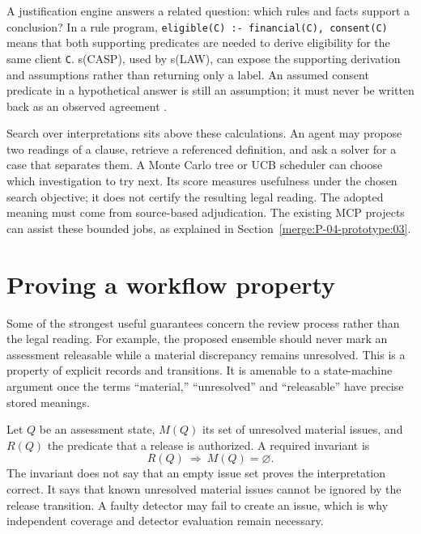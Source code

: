 \documentclass[12pt,a4paper,oneside,openany]{book}
\begin{document}
A justification engine answers a related question: which rules and facts support
a conclusion? In a rule program, \texttt{eligible(C) :- financial(C), consent(C)}
means that both supporting predicates are needed to derive eligibility for the
same client \texttt{C}. s(CASP), used by s(LAW), can expose the supporting
derivation and assumptions rather than returning only a label. An assumed
consent predicate in a hypothetical answer is still an assumption; it must never
be written back as an observed agreement \citep{slaw2024}.

Search over interpretations sits above these calculations. An agent may propose
two readings of a clause, retrieve a referenced definition, and ask a solver for
a case that separates them. A Monte Carlo tree or UCB scheduler can choose which
investigation to try next. Its score measures usefulness under the chosen search
objective; it does not certify the resulting legal reading. The adopted meaning
must come from source-based adjudication. The existing MCP projects can assist
these bounded jobs, as explained in Section~\ref{merge:P-04-prototype:03}.

\section{Proving a workflow property}
\label{merge:M03:10}

\label{sec:proof-workflow}
Some of the strongest useful guarantees concern the review process rather than
the legal reading. For example, the proposed ensemble should never mark an
assessment releasable while a material discrepancy remains unresolved. This is
a property of explicit records and transitions. It is amenable to a state-machine
argument once the terms ``material,'' ``unresolved'' and ``releasable'' have
precise stored meanings.

Let $Q$ be an assessment state, $M(Q)$ its set of unresolved material issues,
and $R(Q)$ the predicate that a release is authorized. A required invariant is
\begin{equation}
 R(Q)\ \Longrightarrow\ M(Q)=\varnothing.
 \label{eq:no-open-release}
\end{equation}
The invariant does not say that an empty issue set proves the interpretation
correct. It says that known unresolved material issues cannot be ignored by
the release transition. A faulty detector may fail to create an issue, which
is why independent coverage and detector evaluation remain necessary.
\end{document}
